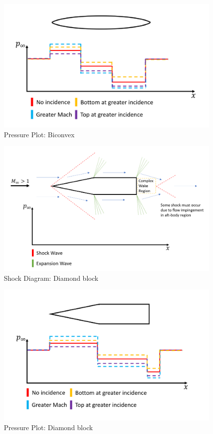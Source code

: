 \documentclass[../main.tex]{subfiles}
\begin{document}
\begin{figure}[h!]
    \centering
    \includegraphics[scale=0.5]{../../images/problem_2/fig_42.png}
    \caption{Pressure Plot: Biconvex}
    \label{bi_pressure}
\end{figure}

\begin{figure}[h!]
    \centering
    \includegraphics[scale=0.5]{../../images/problem_2/fig_51.png}
    \caption{Shock Diagram: Diamond block}
    \label{block_shock}
\end{figure}

\begin{figure}[h!]
    \centering
    \includegraphics[scale=0.5]{../../images/problem_2/fig_52.png}
    \caption{Pressure Plot: Diamond block}
    \label{block_pressure}
\end{figure}
\end{document}
